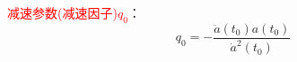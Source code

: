 \documentclass[12pt,a4paper]{article}
\begin{document}
\cite{2010宇宙大尺度结构的形成, 2012宇宙大尺度结构的形成}  \textcolor{red}{减速参数(减速因子)$q_0$}：
\begin{equation}
q_0 = -\frac{\ddot{a}(t_0) a(t_0)}{\dot{a}^2(t_0)}
\end{equation}























\end{document}
